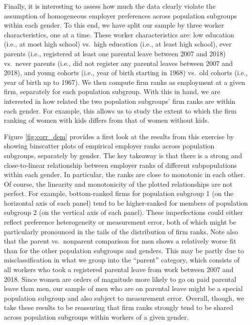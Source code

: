 Finally, it is interesting to assess how much the data clearly violate the assumption of homogeneous employer preferences across population subgroups within each gender. To this end, we have split our sample by three worker characteristics, one at a time. These worker characteristics are: low education (i.e., at most high school) vs.\ high education (i.e., at least high school), ever parents (i.e., registered at least one parental leave between 2007 and 2018) vs.\ never parents (i.e., did not register any parental leaves between 2007 and 2018), and young cohorts (i.e., year of birth starting in 1968) vs.\ old cohorts (i.e., year of birth up to 1967). We then compute firm ranks as employment at a given firm, separately for each population subgroup. With this in hand, we are interested in how related the two population subgroups' firm ranks are within each gender. For example, this allows us to study the extent to which the firm ranking of women with kids differs from that of women without kids.

Figure \ref{fig:corr_dem} provides a first look at the results from this exercise by showing binscatter plots of empirical employer ranks across population subgroups, separately by gender. The key takeaway is that there is a strong and close-to-linear relationship between employer ranks of different subpopulations within each gender. In particular, the ranks are close to monotonic in each other. Of course, the linearity and monotonicity of the plotted relationships are not perfect. For example, bottom-ranked firms for population subgroup 1 (on the horizontal axis of each panel) tend to be higher-ranked for members of population subgroup 2 (on the vertical axis of each panel). These imperfections could either reflect preference heterogeneity or measurement error, both of which might be particularly pronounced in the tails of the distribution of firm ranks. Note also that the parent vs.\ nonparent comparison for men shows a relatively worse fit than for the other population subgroups and genders. This may be partly due to misclassification in what we group into the ``parent'' category, which consists of all workers who took a registered parental leave from work between 2007 and 2018. Since women are orders of magnitude more likely to go on paid parental leave than men, our sample of men who are on parental leave might be a special population subgroup and also subject to measurement error. Overall, though, we take these results to be reassuring that firm ranks strongly tend to be shared across population subgroups within workers of a given gender.

